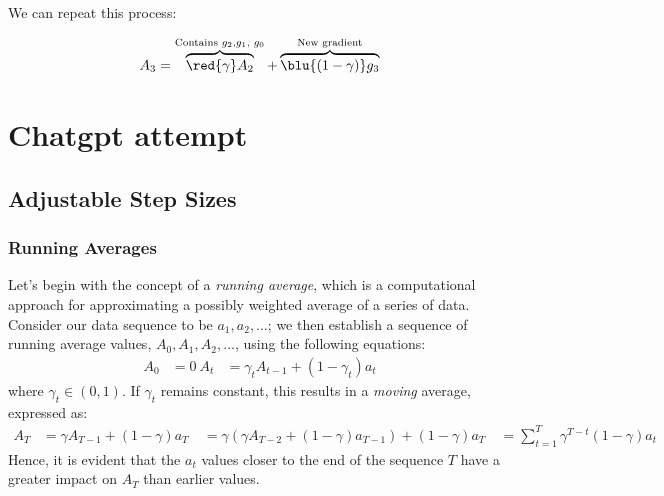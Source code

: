             We can repeat this process:
            
            \begin{equation}
                A_3 = 
                \overbrace{
                    \red{\gamma} A_{2}
                }^{\text{Contains $g_2$,$g_1$, $g_0$}}
                + 
                \overbrace{
                    \blu{(1-\gamma)} g_3
                }^{\text{New gradient}}
            \end{equation}
            
            
            
            
            

        
        
        
        
        
        
        
\section{Chatgpt attempt}

    \subsection{Adjustable Step Sizes}

\subsubsection{Running Averages}
Let's begin with the concept of a \textit{running average}, which is a computational approach for approximating a possibly weighted average of a series of data. Consider our data sequence to be $a_1, a_2, \ldots$; we then establish a sequence of running average values, $A_0, A_1, A_2, \ldots$, using the following equations:
\begin{align*}
A_0 &= 0 \
A_t &= \gamma_t A_{t-1} + (1 - \gamma_t) a_t
\end{align*}
where $\gamma_t \in (0, 1)$. If $\gamma_t$ remains constant, this results in a \textit{moving} average, expressed as:
\begin{align*}
A_T & = \gamma A_{T-1} + (1 - \gamma) a_T \
& = \gamma (\gamma A_{T-2} + (1 - \gamma) a_{T-1}) + (1 - \gamma) a_T \
& = \sum_{t = 1}^T \gamma^{T-t}(1 - \gamma) a_t
\end{align*}
Hence, it is evident that the $a_t$ values closer to the end of the sequence $T$ have a greater impact on $A_T$ than earlier values.

